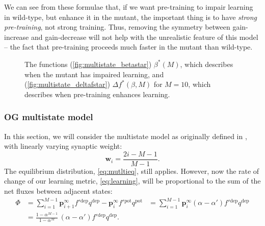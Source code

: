\documentclass[12pt]{article}
\newcommand{\pr}{\mathbf{p}}
\newcommand{\eq}{\pr^\infty}
\newcommand{\w}{\mathbf{w}}
\newcommand{\pot}{^{\text{pot}}}
\newcommand{\dep}{^{\text{dep}}}
\begin{document}
We can see from these formulae that, if we want pre-training to impair learning in wild-type, but enhance it in the mutant, the important thing is to have \emph{strong pre-training}, not strong training.
Thus, removing the symmetry between gain-increase and gain-decrease will not help with the unrealistic feature of this model -- the fact that pre-training proceeds much faster in the mutant than wild-type.


\begin{figure}
 \begin{center}
 \begin{myenuma}
  \item{}\label{fig:multistate_betastar}
  \item{}\label{fig:multistate_deltafstar}
 \end{myenuma}
 \end{center}
  \caption{The functions (\ref{fig:multistate_betastar}) $\beta^*(M)$, which describes when the mutant has impaired learning, and (\ref{fig:multistate_deltafstar}) $\Delta f^*(\beta,M)$ for $M=10$, which describes when pre-training enhances learning.}\label{fig:multistate_star}
\end{figure}



\subsubsection{OG multistate model}\label{sec:multistate_lin}

In this section, we will consider the multistate model as originally defined in \cite{amit1994learning}, \ie with linearly varying synaptic weight:
%
\begin{equation}\label{eq:multistateLinWeight}
  \w_i = \frac{2i-M-1}{M-1}.
\end{equation}
%
The equilibrium distribution, \eqref{eq:mutltieq}, still applies.
However, now the rate of change of our learning metric, \eqref{eq:learning}, will be proportional to the sum of the net fluxes between adjacent states:
%
\begin{equation}\label{eq:multiLinFlux}
  \begin{aligned}
    \Phi &= \sum_{i=1}^{M-1} \eq_{i+1} f'{}\dep q\dep - \eq_i f'{}\pot q\pot
         &= \sum_{i=1}^{M-1} \eq_i (\alpha-\alpha') f'{}\dep q\dep \\
         &= \frac{1-\alpha^{M-1}}{1-\alpha^M} \, (\alpha-\alpha') f'{}\dep q\dep.
  \end{aligned}
\end{equation}
%
\end{document}
